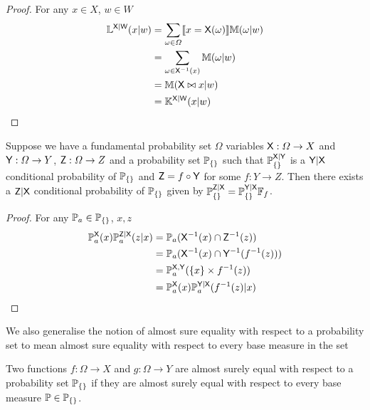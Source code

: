 \begin{proof}
For any $x\in X$, $w\in W$
\begin{align}
	\mathbb{L}^{\mathsf{X}|\mathsf{W}}(x|w) &= \sum_{\omega\in \Omega} \llbracket x=\mathsf{X}(\omega)\rrbracket \mathbb{M}(\omega|w)\\
									&= \sum_{\omega\in \mathsf{X}^{-1}(x)} \mathbb{M}(\omega|w)\\
									&= \mathbb{M}(\mathsf{X}\bowtie x|w)\\
									&= \mathbb{K}^{\mathsf{X}|\mathsf{W}}(x|w)
\end{align}
\end{proof}

\begin{theorem}\label{th:recurs_pushf}
Suppose we have a fundamental probability set $\Omega$ variables $\mathsf{X}:\Omega\to X$ and $\mathsf{Y}:\Omega\to Y$, $\mathsf{Z}:\Omega\to Z$ and a probability set $\mathbb{P}_{\{\}}$ such that $\mathbb{P}_{\{\}}^{\mathsf{X}|\mathsf{Y}}$ is a $\mathsf{Y}|\mathsf{X}$ conditional probability of $\mathbb{P}_{\{\}}$ and $\mathsf{Z}=f\circ \mathsf{Y}$ for some $f:Y\to Z$. Then there exists a $\mathsf{Z}|\mathsf{X}$ conditional probability of $\mathbb{P}_{\{\}}$ given by $\mathbb{P}_{\{\}}^{\mathsf{Z}|\mathsf{X}}=\mathbb{P}_{\{\}}^{\mathsf{Y}|\mathsf{X}}\mathbb{F}_{f}$.
\end{theorem}

\begin{proof}
For any $\mathbb{P}_a\in \mathbb{P}_{\{\}}$, $x,z$
\begin{align}
\mathbb{P}_a^{\mathsf{X}}(x)\mathbb{P}_a^{\mathsf{Z}|\mathsf{X}}(z|x) &= \mathbb{P}_a(\mathsf{X}^{-1}(x)\cap\mathsf{Z}^{-1}(z))\\
					   &= \mathbb{P}_a(\mathsf{X}^{-1}(x)\cap\mathsf{Y}^{-1}(f^{-1}(z)))\\
					   &= \mathbb{P}_a^{\mathsf{X},\mathsf{Y}}(\{x\}\times f^{-1}(z))\\
					   &= \mathbb{P}_a^{\mathsf{X}}(x)\mathbb{P}_a^{\mathsf{Y}|\mathsf{X}}(f^{-1}(z)|x)
\end{align}
\end{proof}

We also generalise the notion of almost sure equality with respect to a probability set to mean almost sure equality with respect to every base measure in the set

\begin{definition}
Two functions $f:\Omega\to X$ and $g:\Omega\to Y$ are almost surely equal with respect to a probability set $\mathbb{P}_{\{\}}$ if they are almost surely equal with respect to every base measure $\mathbb{P}\in \mathbb{P}_{\{\}}$.
\end{definition}


